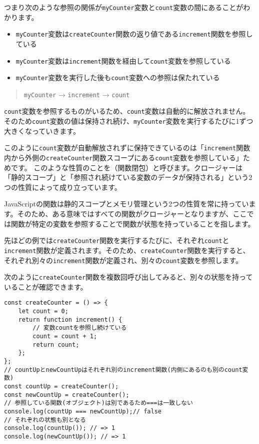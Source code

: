 つまり次のような参照の関係が\texttt{myCounter}変数と\texttt{count}変数の間にあることがわかります。

\begin{itemize}
\item
  \texttt{myCounter}変数は\texttt{createCounter}関数の返り値である\texttt{increment}関数を参照している
\item
  \texttt{myCounter}変数は\texttt{increment}関数を経由して\texttt{count}変数を参照している
\item
  \texttt{myCounter}変数を実行した後も\texttt{count}変数への参照は保たれている
\end{itemize}

\begin{quote}
\texttt{myCounter} → \texttt{increment} → \texttt{count}
\end{quote}

\texttt{count}変数を参照するものがいるため、\texttt{count}変数は自動的に解放されません。
そのため\texttt{count}変数の値は保持され続け、\texttt{myCounter}変数を実行するたびに1ずつ大きくなっていきます。

このように\texttt{count}変数が自動解放されずに保持できているのは「\texttt{increment}関数内から外側の\texttt{createCounter}関数スコープにある\texttt{count}変数を参照している」ためです。
このような性質のことを\textbf{}（関数閉包）と呼びます。クロージャーは「静的スコープ」と「参照され続けている変数のデータが保持される」という2つの性質によって成り立っています。

JavaScriptの関数は静的スコープとメモリ管理という2つの性質を常に持っています。そのため、ある意味ではすべての関数がクロージャーとなりますが、ここでは関数が特定の変数を参照することで関数が状態を持っていることを指します。

先ほどの例では\texttt{createCounter}関数を実行するたびに、それぞれ\texttt{count}と\texttt{increment}関数が定義されます。そのため、\texttt{createCounter}関数を実行すると、それぞれ別々の\texttt{increment}関数が定義され、別々の\texttt{count}変数を参照します。

次のように\texttt{createCounter}関数を複数回呼び出してみると、別々の状態を持っていることが確認できます。

\begin{lstlisting}
const createCounter = () => {
    let count = 0;
    return function increment() {
        // 変数countを参照し続けている
        count = count + 1;
        return count;
    };
};
// countUpとnewCountUpはそれぞれ別のincrement関数(内側にあるのも別のcount変数)
const countUp = createCounter();
const newCountUp = createCounter();
// 参照している関数(オブジェクト)は別であるため===は一致しない
console.log(countUp === newCountUp);// false
// それぞれの状態も別となる
console.log(countUp()); // => 1
console.log(newCountUp()); // => 1
\end{lstlisting}

